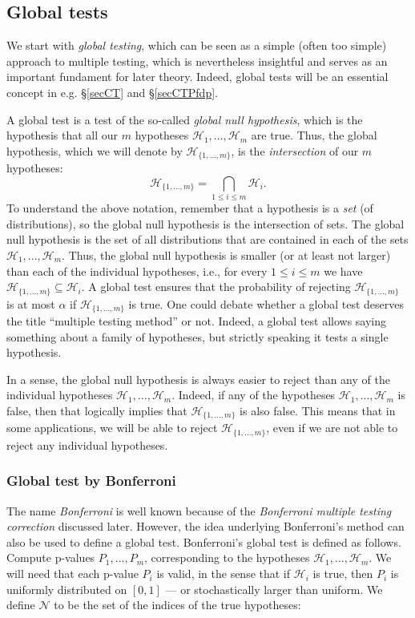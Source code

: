 \documentclass[11pt]{article}
\theoremstyle{plain}
\theoremstyle{definition}
\newcommand{\N}{\mathcal{N}}
\newcommand{\Hy}{\mathcal{H}}
\begin{document}
\subsection{Global tests} \label{secglobaltests}
We start with \emph{global testing}, which can be seen as a simple (often too simple) approach to multiple testing, which is nevertheless insightful and serves as an important fundament for later theory. Indeed, global tests will be an essential concept in e.g. \S\ref{secCT} and \S\ref{secCTPfdp}.

A global test is a test of the so-called \emph{global null hypothesis}, which is the hypothesis that all our $m$ hypotheses $\Hy_1,...,\Hy_m$ are true. Thus, the global hypothesis, which we will denote by $\Hy_{\{1,...,m\}}$,  is the \emph{intersection} of our $m$ hypotheses:
$$\Hy_{\{1,...,m\}}= \bigcap_{1\leq i \leq m}\Hy_i.$$
To understand the above notation, remember that a hypothesis is a \emph{set} (of distributions), so the global null hypothesis is the intersection of sets. The global null hypothesis is the set of all distributions that are contained in each of the sets $\Hy_1,...,\Hy_m$. Thus, the global null hypothesis is smaller (or at least not larger) than each of the individual hypotheses, i.e., for every $1\leq i \leq m$ we have $\Hy_{\{1,...,m\}}\subseteq \Hy_i$. A global test ensures that the probability of rejecting $\Hy_{\{1,...,m\}}$ is at most $\alpha$ if $\Hy_{\{1,...,m\}}$ is true.
One could debate whether a global test deserves the title ``multiple testing method'' or not. Indeed, a global test allows saying something about a family of hypotheses, but strictly speaking it tests a single hypothesis.


In a sense, the global null hypothesis is always easier to reject than any of the individual hypotheses $\Hy_1,...,\Hy_m$. Indeed, if any of the hypotheses  $\Hy_1,...,\Hy_m$ is false, then that logically implies that $\Hy_{\{1,...,m\}}$ is also false. This means that in some applications, we will be able to reject $\Hy_{\{1,...,m\}}$, even if we are not able to reject any individual hypotheses. 

\subsubsection{Global test by Bonferroni} \label{secbonglobal}
The name \emph{Bonferroni} is well known because of the \emph{Bonferroni multiple testing correction} discussed later. However, the idea underlying Bonferroni's method can also be used to define a global test. Bonferroni's global test is defined as follows. Compute p-values $P_1,...,P_m$, corresponding to the hypotheses $\Hy_1,...,\Hy_m$. We will need that each p-value $P_i$ is valid, in the sense that  if $\Hy_i$ is true, then $P_i$ is uniformly distributed on $[0,1]$ --- or stochastically larger than uniform. We define $\N$ to be the set of the indices of the true hypotheses:
\end{document}
